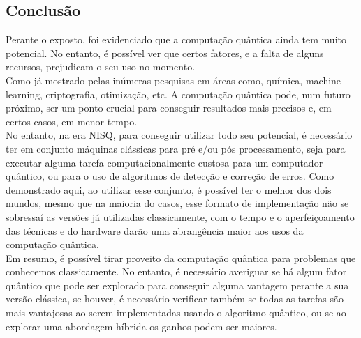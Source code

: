 \documentclass{article}
\begin{document}
\subsection{Conclusão}
Perante o exposto, foi evidenciado que a computação quântica ainda tem muito potencial. No entanto, é possível ver que certos fatores, e a falta de alguns recursos, prejudicam o seu uso no momento.\\
Como já mostrado pelas inúmeras pesquisas em áreas como, química, machine learning, criptografia, otimização, etc. A computação quântica pode, num futuro próximo, ser um ponto crucial para conseguir resultados mais precisos e, em certos casos, em menor tempo.\\
No entanto, na era NISQ, para conseguir utilizar todo seu potencial, é necessário ter em conjunto máquinas clássicas para pré e/ou pós processamento, seja para executar alguma tarefa computacionalmente custosa para um computador quântico, ou para o uso de algoritmos de detecção e correção de erros. Como demonstrado aqui, ao utilizar esse conjunto, é possível ter o melhor dos dois mundos, mesmo que na maioria do casos, esse formato de implementação não se sobressaí as versões já utilizadas classicamente, com o tempo e o aperfeiçoamento das técnicas e do hardware darão uma abrangência maior aos usos da computação quântica.\\
Em resumo, é possível tirar proveito da computação quântica para problemas que conhecemos classicamente. No entanto, é necessário averiguar se há algum fator quântico que pode ser explorado para conseguir alguma vantagem perante a sua versão clássica, se houver, é necessário verificar também se todas as tarefas são mais vantajosas ao serem implementadas usando o algoritmo quântico, ou se ao explorar uma abordagem híbrida os ganhos podem ser maiores.

\nocite{SOARE2009368}
\nocite{odonnell_2015_lecture}
\nocite{bacon_2006_cse}
\nocite{lipics_stacs}
\nocite{odonnell_2015_lecture_2}
\nocite{brodkorb_2019_the}
\nocite{amreen_oracle}
\nocite{kalyanasyndaram_2021_mod04lec23}
\nocite{davis_2006_turing}
\nocite{viswanathan_2013_reductions}
\nocite{Fan_2007}
\nocite{cryptoeprint:2020/1270}
\nocite{buhrman1998quantum}
\nocite{sanchezrivero2023initial}
\nocite{gilliam2020canonical}
\nocite{Kashefi_2002}
\nocite{e21080800}
\nocite{Zeng_2014}
\nocite{atici2004comparative}
\nocite{sundarappan_2022_how}
\nocite{dai_view}
\nocite{sep-game-theory}
\nocite{Giovannetti_2008}
\nocite{jaques2023qram}
\nocite{PythonEWL2022}
\nocite{frackiewicz2011application}
\nocite{Eisert_1999}
\nocite{usman_2019_kilometres}
\nocite{ldiaandr_2021_tower}
\nocite{diptokarmakar47_2019_how}
\nocite{a2020_towers}
\nocite{geeksforgeeks_2014_program}
\nocite{khan_2021_quantum}
\nocite{legn_2022_dilemma}
\nocite{siegelwax_2022_quantum}
\nocite{landi_density}
\nocite{bacon_2006_cse}
\nocite{vijayakrishnan_2019_role}
\nocite{python_scientific}
\nocite{scipyoptimizeminimize_scalar}
\nocite{davis_optimization}
\nocite{scipyoptimizeminimize}





\end{document}
